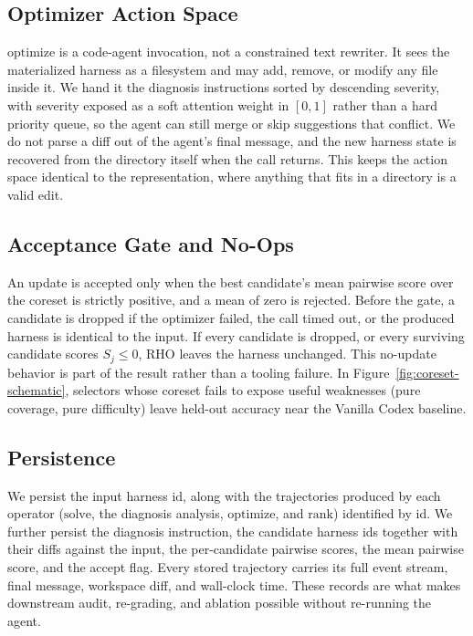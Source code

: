 \documentclass{llmxive}
\providecommand{\method}{\textsc{RHO}}
\begin{document}
\subsection{Optimizer Action Space}

$\mathrm{optimize}$ is a code-agent invocation, not a constrained text rewriter. It sees the materialized harness as a filesystem and may add, remove, or modify any file inside it. We hand it the diagnosis instructions sorted by descending severity, with severity exposed as a soft attention weight in $[0, 1]$ rather than a hard priority queue, so the agent can still merge or skip suggestions that conflict. We do not parse a diff out of the agent's final message, and the new harness state is recovered from the directory itself when the call returns. This keeps the action space identical to the representation, where anything that fits in a directory is a valid edit.

\subsection{Acceptance Gate and No-Ops}

An update is accepted only when the best candidate's mean pairwise score over the coreset is strictly positive, and a mean of zero is rejected. Before the gate, a candidate is dropped if the optimizer failed, the call timed out, or the produced harness is identical to the input. If every candidate is dropped, or every surviving candidate scores $S_j \leq 0$, \method{} leaves the harness unchanged. This no-update behavior is part of the result rather than a tooling failure. In Figure~\ref{fig:coreset-schematic}, selectors whose coreset fails to expose useful weaknesses (pure coverage, pure difficulty) leave held-out accuracy near the Vanilla Codex baseline.

\subsection{Persistence}

We persist the input harness id, along with the trajectories produced by each operator ($\mathrm{solve}$, the diagnosis analysis, $\mathrm{optimize}$, and $\mathrm{rank}$) identified by id. We further persist the diagnosis instruction, the candidate harness ids together with their diffs against the input, the per-candidate pairwise scores, the mean pairwise score, and the accept flag. Every stored trajectory carries its full event stream, final message, workspace diff, and wall-clock time. These records are what makes downstream audit, re-grading, and ablation possible without re-running the agent.
\end{document}
